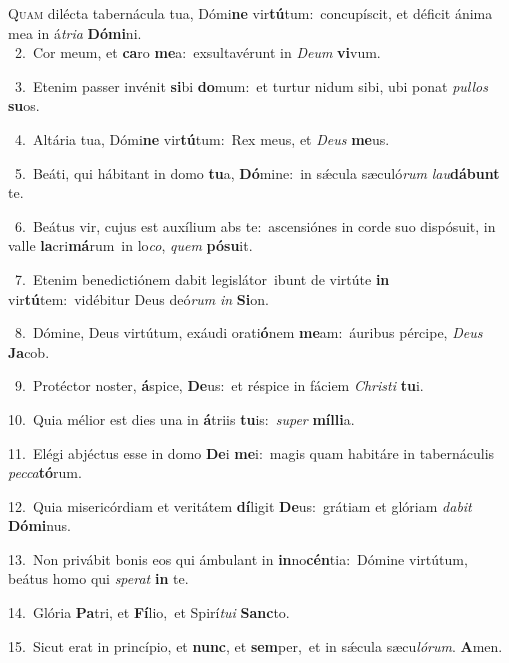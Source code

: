 \lettrine{\initial\textcolor{\initialcolor}{Q}}{uam} dilécta tabernácula tua, Dómi\textbf{ne} vir\-\textbf{tú}\-tum:~\star concupíscit, et déficit ánima mea in á\-\textit{tri}\-\textit{a} \textbf{Dó}\-\textbf{mi}ni.\\
{\numbfont\textcolor{\numbcolor}{~2.}}~Cor meum, et \textbf{ca}\-ro \textbf{me}\-a:~\star exsultavérunt in \textit{De}\-\textit{um} \textbf{vi}\-vum.\par
{\numbfont\textcolor{\numbcolor}{~3.}}~Etenim passer invénit \textbf{si}\-bi \textbf{do}\-mum:~\star et turtur nidum sibi, ubi ponat \textit{pul}\-\textit{los} \textbf{su}\-os.\par
{\numbfont\textcolor{\numbcolor}{~4.}}~Altária tua, Dómi\textbf{ne} vir\-\textbf{tú}\-tum:~\star Rex meus, et \textit{De}\-\textit{us} \textbf{me}\-us.\par
{\numbfont\textcolor{\numbcolor}{~5.}}~Beáti, qui hábitant in domo \textbf{tu}\-a, \textbf{Dó}\-mine:~\star in sǽcula sæculó\textit{rum} \textit{lau}\-\textbf{dá}\textbf{bunt} te.\par
{\numbfont\textcolor{\numbcolor}{~6.}}~Beátus vir, cujus est auxílium abs te:~\dagger ascensiónes in corde suo dispósuit, in valle \textbf{la}\-cri\-\textbf{má}\-rum~\star in lo\-\textit{co}\-, \textit{quem} \textbf{pó}\-\textbf{su}it.\par
{\numbfont\textcolor{\numbcolor}{~7.}}~Etenim benedictiónem dabit legislátor~\dagger ibunt de virtúte \textbf{in} vir\-\textbf{tú}\-tem:~\star vidébitur Deus deó\textit{rum} \textit{in} \textbf{Si}\-on.\par
{\numbfont\textcolor{\numbcolor}{~8.}}~Dómine, Deus virtútum, exáudi orati\-\textbf{ó}\-nem \textbf{me}\-am:~\star áuribus pércipe, \textit{De}\-\textit{us} \textbf{Ja}\-cob.\par
{\numbfont\textcolor{\numbcolor}{~9.}}~Protéctor noster, \textbf{á}\-spice, \textbf{De}\-us:~\star et réspice in fáciem \textit{Chris}\-\textit{ti} \textbf{tu}\-i.\par
{\numbfont\textcolor{\numbcolor}{10.}}~Quia mélior est dies una in \textbf{á}\-triis \textbf{tu}\-is:~\star \textit{su}\-\textit{per} \textbf{míl}\-\textbf{li}a.\par
{\numbfont\textcolor{\numbcolor}{11.}}~Elégi abjéctus esse in domo \textbf{De}\-i \textbf{me}\-i:~\star magis quam habitáre in tabernáculis \textit{pec}\-\textit{ca}\textbf{tó}rum.\par
{\numbfont\textcolor{\numbcolor}{12.}}~Quia misericórdiam et veritátem \textbf{dí}\-ligit \textbf{De}\-us:~\star grátiam et glóriam \textit{da}\-\textit{bit} \textbf{Dó}\-\textbf{mi}nus.\par
{\numbfont\textcolor{\numbcolor}{13.}}~Non privábit bonis eos qui ámbulant in \textbf{in}\-no\-\textbf{cén}\-tia:~\star Dómine virtútum, beátus homo qui \textit{spe}\-\textit{rat} \textbf{in} te.\par
{\numbfont\textcolor{\numbcolor}{14.}}~Glória \textbf{Pa}\-tri, et \textbf{Fí}\-lio,~\star et Spirí\-\textit{tu}\-\textit{i} \textbf{Sanc}\-to.\par
{\numbfont\textcolor{\numbcolor}{15.}}~Sicut erat in princípio, et \textbf{nunc}\-, et \textbf{sem}\-per,~\star et in sǽcula sæcu\-\textit{ló}\-\textit{rum}. \textbf{A}\-men.\par
